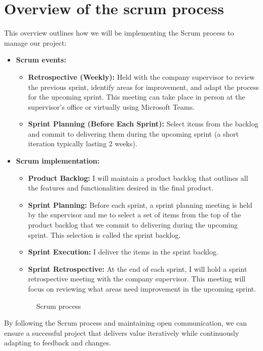 \section{Overview of the scrum process}
This overview outlines how we will be implementing the Scrum process to manage our project:
\begin{itemize}
    \item \textbf{Scrum events:} \begin{itemize}
              \item \textbf{Retrospective (Weekly):} Held with the company supervisor to review the previous sprint, identify areas for improvement, and adapt the process for the upcoming sprint. This meeting can take place in person at the supervisor's office or virtually using Microsoft Teams.
              \item \textbf{Sprint Planning (Before Each Sprint):} Select items from the backlog and commit to delivering them during the upcoming sprint (a short iteration typically lasting 2 weeks).
          \end{itemize}
    \item \textbf{Scrum implementation:} \begin{itemize}
              \item \textbf{Product Backlog:} I will maintain a product backlog that outlines all the features and functionalities desired in the final product.
              \item \textbf{Sprint Planning:} Before each sprint, a sprint planning meeting is held by the supervisor and me to select a set of items from the top of the product backlog that we commit to delivering during the upcoming sprint. This selection is called the sprint backlog.
              \item \textbf{Sprint Execution:} I deliver the items in the sprint backlog.
              \item \textbf{Sprint Retrospective:} At the end of each sprint, I will hold a sprint retrospective meeting with the company supervisor. This meeting will focus on reviewing what areas need improvement in the upcoming sprint.
          \end{itemize}

\begin{figure}[htpb]
    \centering
    \caption{Scrum process  }
    \label{fig:scrum_process}
\end{figure}

\end{itemize}
By following the Scrum process and maintaining open communication, we can ensure a successful project that delivers value iteratively while continuously adapting to feedback and changes.
